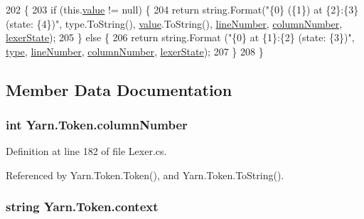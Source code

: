 \begin{DoxyCode}
202                                           \{
203             \textcolor{keywordflow}{if} (this.\hyperlink{a00167_a3df6b32d6190a639619a3f064c2154e2}{value} != null) \{
204                 \textcolor{keywordflow}{return} string.Format(\textcolor{stringliteral}{"\{0\} (\{1\}) at \{2\}:\{3\} (state: \{4\})"}, type.ToString(), 
      \hyperlink{a00167_a3df6b32d6190a639619a3f064c2154e2}{value}.ToString(), \hyperlink{a00167_a80fe710713201bb793a41452e314a721}{lineNumber}, \hyperlink{a00167_a9a0f0a8a7ab1e90ab48f15192323ffca}{columnNumber}, 
      \hyperlink{a00167_a710099e7abe84f30864a320cc7464214}{lexerState});
205             \} \textcolor{keywordflow}{else} \{
206                 \textcolor{keywordflow}{return} string.Format (\textcolor{stringliteral}{"\{0\} at \{1\}:\{2\} (state: \{3\})"}, \hyperlink{a00167_a471a25da67fda0524f2375f9a882aafa}{type}, 
      \hyperlink{a00167_a80fe710713201bb793a41452e314a721}{lineNumber}, \hyperlink{a00167_a9a0f0a8a7ab1e90ab48f15192323ffca}{columnNumber}, \hyperlink{a00167_a710099e7abe84f30864a320cc7464214}{lexerState});
207             \}
208         \}
\end{DoxyCode}


\subsection{Member Data Documentation}
\hypertarget{a00167_a9a0f0a8a7ab1e90ab48f15192323ffca}{
\subsubsection[{column\-Number}]{\setlength{\rightskip}{0pt plus 5cm}int Yarn.\-Token.\-column\-Number}}\label{a00167_a9a0f0a8a7ab1e90ab48f15192323ffca}


Definition at line 182 of file Lexer.\-cs.



Referenced by Yarn.\-Token.\-Token(), and Yarn.\-Token.\-To\-String().

\hypertarget{a00167_a089d248c904a6e8366b81c2c47ff5af8}{
\subsubsection[{context}]{\setlength{\rightskip}{0pt plus 5cm}string Yarn.\-Token.\-context}}\label{a00167_a089d248c904a6e8366b81c2c47ff5af8}


